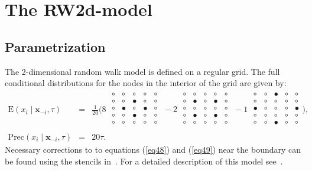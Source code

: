 \documentclass[a4paper,11pt]{article}
\begin{document}



\section*{The RW2d-model}
\subsection*{Parametrization}

The 2-dimensional random walk model is defined on a regular grid.  The
full conditional distributions for the nodes in the interior of the
grid are given by:
\begin{eqnarray}\label{eq48}
    \text{E}(x_{i} \mid \mathbf{x}_{-i}, \tau)
    &=& \frac{1}{20}\Biggl( 8 \;
    \begin{smallmatrix}
        \circ & \circ & \circ & \circ & \circ
        \\
        \circ & \circ & \bullet & \circ & \circ
        \\
        \circ & \bullet & \circ & \bullet & \circ
        \\
        \circ & \circ & \bullet & \circ & \circ
        \\
        \circ & \circ & \circ & \circ & \circ
        \\
    \end{smallmatrix}
    \; -2 \;
    \begin{smallmatrix}
        \circ & \circ & \circ & \circ & \circ
        \\
        \circ & \bullet & \circ & \bullet & \circ
        \\
        \circ & \circ & \circ & \circ & \circ
        \\
        \circ & \bullet & \circ & \bullet & \circ
        \\
        \circ & \circ & \circ & \circ & \circ
        \\
    \end{smallmatrix}
    \; -1 \;
    \begin{smallmatrix}
        \circ & \circ & \bullet & \circ & \circ
        \\
        \circ & \circ & \circ & \circ & \circ
        \\
        \bullet & \circ & \circ & \circ & \bullet
        \\
        \circ & \circ & \circ & \circ & \circ
        \\
        \circ & \circ & \bullet & \circ & \circ
        \\
    \end{smallmatrix}
    \Biggr), \\ \label{eq49}
    \text{Prec}(x_{i}\mid \mathbf{x}_{-i},
    \tau)
    &=& 20\tau.
\end{eqnarray}
Necessary corrections to to equations (\ref{eq48}) and (\ref{eq49})
near the boundary can be found using the stencils in~\cite{art398}.
For a detailed description of this model
see~\cite[Sec.~3.4.2]{book80}.
\end{document}
